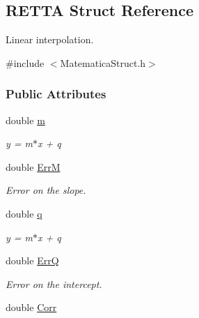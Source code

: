 \hypertarget{structRETTA}{}\subsection{R\+E\+T\+TA Struct Reference}
\label{structRETTA}


Linear interpolation.  




{\ttfamily \#include $<$Matematica\+Struct.\+h$>$}

\subsubsection*{Public Attributes}
\begin{DoxyCompactItemize}
\item 
double \hyperlink{structRETTA_a5175b356eac1d83a42608b42a25d00b9}{m}\hypertarget{structRETTA_a5175b356eac1d83a42608b42a25d00b9}{}\label{structRETTA_a5175b356eac1d83a42608b42a25d00b9}

\begin{DoxyCompactList}\small\item\em y = m$\ast$x + q \end{DoxyCompactList}\item 
double \hyperlink{structRETTA_a9fb99a6e1b11a7d83154875843000fc8}{ErrM}\hypertarget{structRETTA_a9fb99a6e1b11a7d83154875843000fc8}{}\label{structRETTA_a9fb99a6e1b11a7d83154875843000fc8}

\begin{DoxyCompactList}\small\item\em Error on the slope. \end{DoxyCompactList}\item 
double \hyperlink{structRETTA_a5b5e3f03e443adea974601f295136638}{q}\hypertarget{structRETTA_a5b5e3f03e443adea974601f295136638}{}\label{structRETTA_a5b5e3f03e443adea974601f295136638}

\begin{DoxyCompactList}\small\item\em y = m$\ast$x + q \end{DoxyCompactList}\item 
double \hyperlink{structRETTA_a3d2f5c6d85a4ffb02fcf4410f3b049a3}{ErrQ}\hypertarget{structRETTA_a3d2f5c6d85a4ffb02fcf4410f3b049a3}{}\label{structRETTA_a3d2f5c6d85a4ffb02fcf4410f3b049a3}

\begin{DoxyCompactList}\small\item\em Error on the intercept. \end{DoxyCompactList}\item 
double \hyperlink{structRETTA_a6f469ce3f1211104f5524db4b5303ed9}{Corr}\hypertarget{structRETTA_a6f469ce3f1211104f5524db4b5303ed9}{}\label{structRETTA_a6f469ce3f1211104f5524db4b5303ed9}


\end{DoxyCompactItemize}
